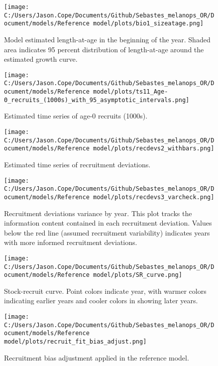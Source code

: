 \documentclass[11pt,
  english,
  letterpaper,
]{article}
\begin{document}
\begin{figure}
\centering
\texttt{[image: C:/Users/Jason.Cope/Documents/Github/Sebastes\_melanops\_OR/Document/models/Reference model/plots/bio1\_sizeatage.png]}
\caption{Model estimated length-at-age in the beginning of the year. Shaded area indicates 95 percent distribution of length-at-age around the estimated growth curve.\label{fig:len-age-ss}}
\end{figure}

\begin{figure}
\centering
\texttt{[image: C:/Users/Jason.Cope/Documents/Github/Sebastes\_melanops\_OR/Document/models/Reference model/plots/ts11\_Age-0\_recruits\_(1000s)\_with\_95\_asymptotic\_intervals.png]}
\caption{Estimated time series of age-0 recruits (1000s).\label{fig:recruits}}
\end{figure}

\begin{figure}
\centering
\texttt{[image: C:/Users/Jason.Cope/Documents/Github/Sebastes\_melanops\_OR/Document/models/Reference model/plots/recdevs2\_withbars.png]}
\caption{Estimated time series of recruitment deviations.\label{fig:rec-devs}}
\end{figure}

\begin{figure}
\centering
\texttt{[image: C:/Users/Jason.Cope/Documents/Github/Sebastes\_melanops\_OR/Document/models/Reference model/plots/recdevs3\_varcheck.png]}
\caption{Recruitment deviations variance by year. This plot tracks the information content contained in each recruitment deviation. Values below the red line (assumed recruitment variability) indicates years with more informed recruitment deviations.\label{fig:rec-devs-sigmas}}
\end{figure}

\begin{figure}
\centering
\texttt{[image: C:/Users/Jason.Cope/Documents/Github/Sebastes\_melanops\_OR/Document/models/Reference model/plots/SR\_curve.png]}
\caption{Stock-recruit curve. Point colors indicate year, with warmer colors indicating earlier years and cooler colors in showing later years.\label{fig:bh-curve}}
\end{figure}

\begin{figure}
\centering
\texttt{[image: C:/Users/Jason.Cope/Documents/Github/Sebastes\_melanops\_OR/Document/models/Reference model/plots/recruit\_fit\_bias\_adjust.png]}
\caption{Recruitment bias adjustment applied in the reference model.\label{fig:bias-adj}}
\end{figure}
\end{document}
